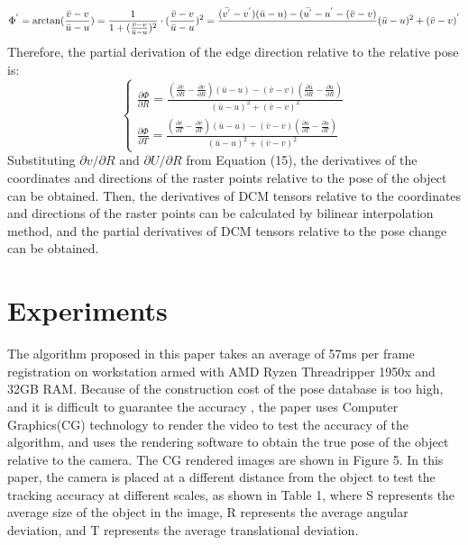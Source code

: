 \documentclass{cta-author}
\begin{document}
  \begin{equation}\label{eq17}
    \Phi^{'}=\arctan(\frac{\bar{v}-v}{\bar{u}-u})
    =\frac{1}{1+(\frac{\bar{v}-v}{\bar{u}-u})^{2}}\cdot(\frac{\bar{v}-v}{\bar{u}-u})^{2}
  =\frac{(\bar{v^{'}}-v^{'})(\bar{u}-u)-(\bar{u^{'}}-u^{'}-(\bar{v}-v)}\\
  {(\bar{u}-u)^{2}+(\bar{v}-v)^{'}}
    \end{equation}
    Therefore, the partial derivation of the edge direction relative to the relative pose is:
   \begin{equation}\label{eq18}
    \begin{cases}
     \frac{\partial \Phi}{\partial R}=\frac{(\frac{\partial \bar{v}}{\partial R}-\frac{\partial v}{\partial R})
     (\bar{u}-u)-(\bar{v}-v)(\frac{\partial \bar{u}}{\partial R}-\frac{\partial u}{\partial R})}{(\bar{u}-u)^{2}+(\bar{v}-v)^{2}}\\
     \frac{\partial \Phi}{\partial T}=\frac{(\frac{\partial \bar{v}}{\partial T}-\frac{\partial v}{\partial T})
     (\bar{u}-u)-(\bar{v}-v)(\frac{\partial \bar{u}}{\partial T}-\frac{\partial u}{\partial T})}{(\bar{u}-u)^{2}+(\bar{v}-v)^{2}}

    \end{cases}
      \end{equation}
  Substituting $\partial v/\partial R$ and $\partial U/\partial R$ from Equation (15), the derivatives of the coordinates and directions of the raster points relative to the pose of the object can be obtained. Then, the derivatives of DCM tensors relative to the coordinates and directions of the raster points can be calculated by bilinear interpolation method, and the partial derivatives of DCM tensors relative to the pose change can be obtained.


  \section{Experiments}\label{sec4}
  The algorithm proposed in this paper takes an average of 57ms per frame registration on workstation armed with AMD Ryzen Threadripper 1950x and 32GB RAM. 
  Because of the construction cost of the pose database is too high, and it is difficult to guarantee the accuracy , the paper uses Computer Graphics(CG) technology to render the video to test the accuracy of the algorithm, and uses the rendering software to obtain the true pose of the object relative to the camera. The CG rendered images are shown in Figure 5.
  In this paper, the camera is placed at a different distance from the object to test the tracking accuracy at different scales, as shown in Table 1, where S represents the average size of the object in the image, R represents the average angular deviation, and T represents the average translational deviation.
\end{document}
